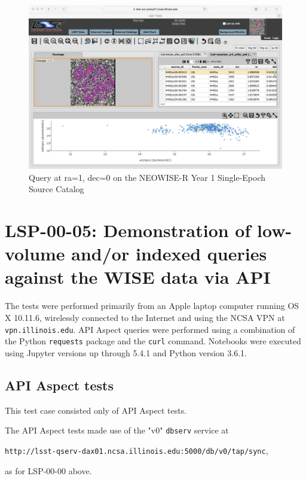 \documentclass[DM,lsstdraft,STR,toc]{lsstdoc}
\begin{document}
\begin{figure}
  \includegraphics[width=\linewidth]{lsp-00-00/Portal-neowiser_yr1_p1bs_psd.png}
  \caption{Query at ra=1, dec=0 on the NEOWISE-R Year 1 Single-Epoch Source Catalog}
  \label{fig:portal-query-neowiser-psd}
\end{figure}


\section{LSP-00-05: Demonstration of low-volume and/or indexed queries against the WISE data via API}
\label{sect:detail-lsp-00-05}

The tests were performed primarily from an Apple laptop computer running OS X 10.11.6, wirelessly connected to the Internet and using the NCSA VPN at \texttt{vpn.illinois.edu}.
API Aspect queries were performed using a combination of the Python \texttt{requests} package and the \texttt{curl} command.
Notebooks were executed using Jupyter versions up through 5.4.1 and Python version 3.6.1.

\subsection{API Aspect tests}

This test case consisted only of API Aspect tests.

The API Aspect tests made use of the "v0" \texttt{dbserv} service at 

\begin{center}
\texttt{http://lsst-qserv-dax01.ncsa.illinois.edu:5000/db/v0/tap/sync},
\end{center}

as for LSP-00-00 above.
\end{document}
